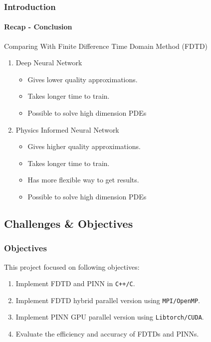 \begin{frame}
  \frametitle{Introduction}
  \framesubtitle{Recap - Conclusion}
  \begin{block}{Comparing With Finite Difference Time Domain Method (FDTD)}
    \begin{enumerate}
      \item Deep Neural Network \cite{FIRST}
            \begin{itemize}
              \item Gives lower quality approximations.
              \item Takes longer time to train.
              \item Possible to solve high dimension PDEs \vspace*{1em}
            \end{itemize}
      \item Physics Informed Neural Network
            \begin{itemize}
              \item Gives higher quality approximations.
              \item Takes longer time to train.         
              \item Has more flexible way to get results.
              \item Possible to solve high dimension PDEs
            \end{itemize}
    \end{enumerate}    
  \end{block}
\end{frame}



\subsection{Challenges \& Objectives}

\begin{frame}
  \frametitle{Objectives}
  This project focused on following objectives:
    \begin{enumerate}
      \item Implement FDTD and PINN in \texttt{C++/C}.
      \item Implement FDTD hybrid parallel version using \texttt{MPI/OpenMP}.
      \item Implement PINN GPU parallel version using \texttt{Libtorch/CUDA}.
      \item Evaluate the efficiency and accuracy of FDTDs and PINNs.
    \end{enumerate}
\end{frame}


